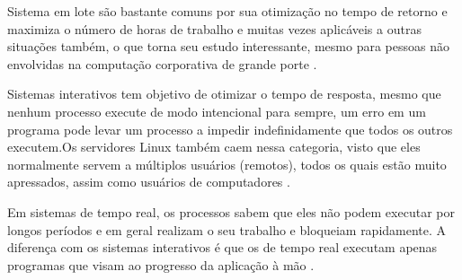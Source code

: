 Sistema em lote são bastante comuns por sua otimização no tempo de retorno e maximiza o número de horas de trabalho e muitas vezes aplicáveis a outras situações também, o que torna seu estudo interessante, mesmo para pessoas não envolvidas na computação corporativa de grande porte \cite{Tanenbaum2016}.

Sistemas interativos tem objetivo de otimizar o tempo de resposta, mesmo que nenhum processo execute de modo intencional para sempre, um erro em um programa pode levar um processo a impedir indefinidamente que todos os outros executem.Os servidores Linux também caem nessa categoria, visto que eles normalmente servem a múltiplos usuários (remotos), todos os quais estão muito apressados, assim como usuários de computadores \cite{Tanenbaum2016}.

Em sistemas de tempo real, os processos sabem que eles não podem executar por longos períodos e em geral realizam o seu trabalho e bloqueiam rapidamente. A diferença com os sistemas interativos é que os de tempo real executam apenas programas que visam ao progresso da aplicação à mão \cite{Tanenbaum2016}.